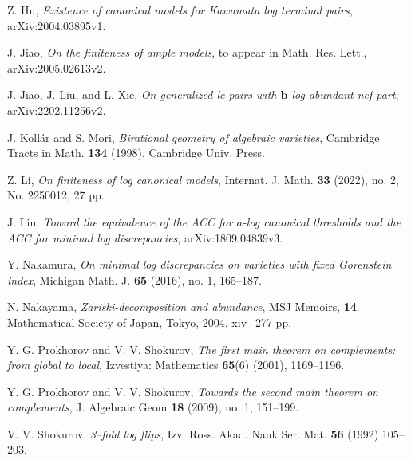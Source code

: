 \documentclass[11pt]{amsart}
\numberwithin{equation}{section}
\newcommand{\bb}{\bm{b}}
\theoremstyle{definition}
\theoremstyle{definition}
\begin{document}
\begin{thebibliography}{99}
 Z. Hu, \textit{Existence of canonical models for Kawamata log terminal pairs}, arXiv:2004.03895v1.

 J. Jiao, \textit{On the finiteness of ample models}, to appear in Math. Res. Lett., arXiv:2005.02613v2.


 J. Jiao, J. Liu, and L. Xie, \textit{On generalized lc pairs with $\bb$-log abundant nef part}, arXiv:2202.11256v2.


		
 J. Koll\'{a}r and S. Mori, \textit{Birational geometry of algebraic varieties}, Cambridge Tracts in Math. \textbf{134} (1998), Cambridge Univ. Press.




 Z. Li, \textit{On finiteness of log canonical models}, Internat. J. Math. \textbf{33} (2022), no. 2, No. 2250012, 27 pp.

 J. Liu, \emph{Toward the equivalence of the ACC for $a$-log canonical thresholds and the ACC for minimal log discrepancies}, arXiv:1809.04839v3.

 Y. Nakamura, \textit{On minimal log discrepancies on varieties with fixed Gorenstein index}, Michigan Math. J. \textbf{65} (2016), no. 1, 165--187.

 N. Nakayama, \textit{Zariski-decomposition and abundance}, MSJ Memoirs, \textbf{14}. Mathematical Society of Japan, Tokyo, 2004. xiv+277 pp.

 Y. G. Prokhorov and V. V. Shokurov, 
\textit{The first main theorem on complements: from global to local}, Izvestiya: Mathematics \textbf{65}(6) (2001), 1169--1196.

 Y. G. Prokhorov and V. V. Shokurov,  
\textit{Towards the second main theorem on complements}, J. Algebraic Geom \textbf{18} (2009), no. 1, 151--199.

 V. V. Shokurov, 
\textit{3–fold log flips}, Izv. Ross. Akad. Nauk Ser. Mat. \textbf{56} (1992) 105--203.


\end{thebibliography}
\end{document}

